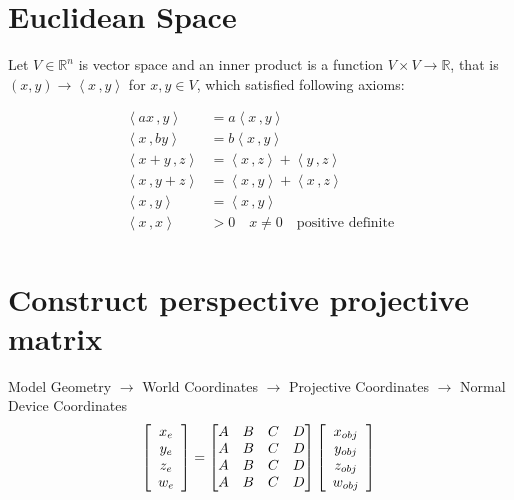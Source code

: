 \documentclass[UTF8]{article}
\begin{document}
\section{Euclidean Space}
Let $V \in \mathbb{R}^n$ is vector space and an inner product is a function $V \times V \rightarrow \mathbb{R}$, that is 
$(x, y) \rightarrow \left< x \,, y \right>$ for $x, y \in V$, which satisfied following axioms:

\begin{equation}
\begin{aligned}
\left<ax \,, y \right> &= a \left< x \,, y \right> \\  
\left<x \,, by \right> &= b \left< x \,, y \right> \\
\left<x + y \,, z \right> &= \left< x \,, z \right> + \left< y \,, z \right> \\
\left<x\,, y + z \right> &= \left< x \,, y \right> + \left< x \,, z \right> \\
\left<x \,, y \right> &= \left<x \,, y \right> \\
\left<x \,, x \right> &> 0 \quad x \neq 0 \quad \text{positive definite}\\
\end{aligned}
\end{equation} 
\section{Construct perspective projective matrix}
Model Geometry $\rightarrow$ World Coordinates $\rightarrow$ Projective Coordinates
$\rightarrow$ Normal Device Coordinates
\[  
    \left[ \begin{array}{c} 
    x_{e} \\ 
    y_{e} \\ 
    z_{e} \\ 
    w_{e} \\ 
    \end{array} \right] 
    = \begin{bmatrix} 
    A & B & C & D\\ 
    A & B & C & D\\ 
    A & B & C & D\\ 
    A & B & C & D\\ 
    \end{bmatrix} 
    \left[ 
    \begin{array}{c} 
    x_{obj} \\ 
    y_{obj} \\ 
    z_{obj} \\ 
    w_{obj} \\ 
    \end{array} 
    \right] \\
\]
\end{document}
